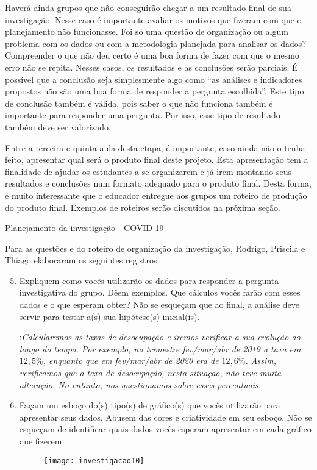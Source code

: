 \begin{texto}
{Haverá ainda grupos que não conseguirão chegar a um resultado final de sua investigação. Nesse caso é importante avaliar os motivos que fizeram com que o planejamento não funcionasse. Foi só uma questão de organização ou algum problema com os dados ou com a metodologia planejada para analisar os dados? Compreender o que não deu certo é uma boa forma de fazer com que o mesmo erro não se repita. Nesses casos, os resultados e as conclusões serão parciais. É possível que a conclusão seja simplesmente algo como “as análises e indicadores propostos não são uma boa forma de responder a pergunta escolhida”. Este tipo de conclusão também é válida, pois saber o que não funciona também é importante para responder uma pergunta. Por isso, esse tipo de resultado também deve ser valorizado.

Entre a terceira e quinta aula desta etapa, é importante, caso ainda não o tenha feito, apresentar  qual será o produto final deste projeto. Esta apresentação tem a finalidade de ajudar os estudantes a se organizarem e já irem montando seus resultados e conclusões num formato adequado para o produto final. Desta forma, é muito interessante que o educador entregue aos grupos um roteiro de produção do produto final. Exemplos de roteiros serão discutidos na próxima seção.
}
\end{texto}
\begin{example}{Planejamento da investigação - COVID-19}

Para as questões  e  do roteiro de organização da investigação, Rodrigo, Priscila e Thiago elaboraram os seguintes registros:

\begin{enumerate}[label=\titem{\arabic*)}]\setcounter{enumi}{4}
\item Expliquem como vocês utilizarão os dados para responder a pergunta investigativa do grupo. Dêem exemplos. Que cálculos vocês farão com esses dados e o que esperam obter? Não se esqueçam que ao final, a análise deve servir para testar a(s) sua hipótese(s) inicial(is).

:\textit{Calcularemos as taxas de desocupação e iremos verificar a sua evolução ao longo do tempo. Por exemplo, no trimestre fev/mar/abr de 2019 a taxa era $12,5\%$, enquanto que em fev/mar/abr de 2020 era de $12,6\%$.  Assim, verificamos que a taxa de desocupação, nesta situação, não teve muita alteração. No entanto, nos questionamos sobre esses percentuais.}

\item Façam um esboço do(s) tipo(s) de gráfico(s) que vocês utilizarão para apresentar seus dados. Abusem das cores e criatividade em seu esboço. Não se esqueçam de identificar quais dados vocês esperam apresentar em cada gráfico que fizerem.

\begin{figure}[H]
\centering

\texttt{[image: investigacao10]}
\end{figure}

\end{enumerate}

\end{example}


